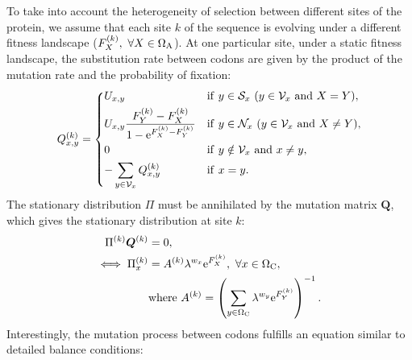 To take into account the heterogeneity of selection between different sites of the protein, we assume that each site $k$ of the sequence is evolving under a different fitness landscape ($F_X^{(k)}, \ \forall X \in \Omega_{\mathrm{A}} $).
At one particular site, under a static fitness landscape, the \gls{substitution} rate between \glspl{codon} are given by the product of the mutation rate and the probability of fixation:
\begin{equation}
\label{codonSubRates}
Q_{x, y}^{(k)} =
\begin{dcases}
U_{x, y}
& \mathrm{if} \ y \in \mathcal{S}_x \ (y \in \mathcal{V}_x \ \mathrm{and} \ X = Y),  \\
U_{x, y} \dfrac{F_Y^{(k)} - F_X^{(k)}}{1 - \mathrm{e}^{F_X^{(k)} - F_Y^{(k)}}}
& \mathrm{if} \ y \in \mathcal{N}_x \ (y \in \mathcal{V}_x \ \mathrm{and} \ X \neq Y),  \\
0
& \mathrm{if} \  y \notin \mathcal{V}_x \ \mathrm{ and } \ x \neq y, \\
- \sum_{y \in \mathcal{V}_x }  Q_{x, y}^{(k)}
& \mathrm{if} \ x = y.
 \\
\end{dcases}
\end{equation}
The stationary distribution $\Pi$ must be annihilated by the mutation matrix $\bm{Q}$, which gives the stationary distribution at site $k$:
\begin{align}
\Pi^{(k)} \bm{Q}^{(k)}
& =0 ,\\
\iff \Pi_x^{(k)}
& =A^{(k)} \lambda^{w_x} \mathrm{e}^{F_X^{(k)}} ,\ \forall x \in \Omega_{\mathrm{C}},\\
& \mathrm{ where } \ A^{(k)} = \left( \sum_{y \in \Omega_{\mathrm{C}}} \lambda^{w_y} \mathrm{e}^{F_Y^{(k)}} \right)^{-1}.
\label{codonStationarity}
\end{align}
Interestingly, the mutation process between \glspl{codon} fulfills an equation similar to detailed balance conditions:
